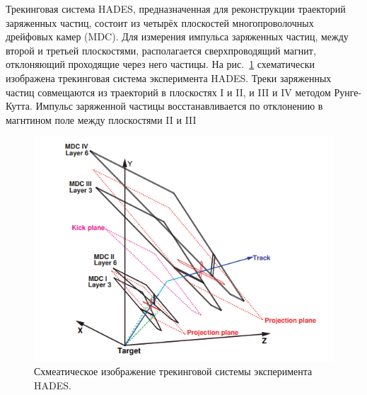Трекинговая система HADES, предназначенная для реконструкции траекторий заряженных частиц, состоит из четырёх плоскостей многопроволочных дрейфовых камер (MDC).
Для измерения импульса заряженных частиц, между второй и третьей плоскостями, располагается сверхпроводящий магнит, отклоняющий проходящие через него частицы.
На рис.~\ref{fig:hades_tracking} схематически изображена трекинговая система эксперимента HADES.
Треки заряженных частиц совмещаются из траекторий в плоскостях I и II, и III и IV методом Рунге-Кутта.
Импульс заряженной частицы восстанавливается по отклонению в магнтином поле между плоскостями II и III 
%
\begin{figure}[ht]
\begin{center}
    \includegraphics[width=0.95\linewidth]{images/hades_tracking_system.png}
    \caption{Схмеатическое изображение трекинговой системы эксперимента HADES.}
    \label{fig:hades_tracking}
\end{center}
\end{figure}

